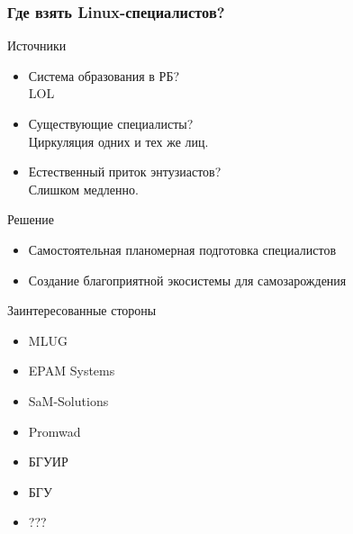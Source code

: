 \begin{frame}
	\frametitle{Где взять Linux-специалистов?}

	\begin{block}{Источники}
		\begin{itemize}
			\item Система образования в РБ? \\
				LOL
				\pause
			\item Существующие специалисты? \\
				Циркуляция одних и тех же лиц.
				\pause
			\item Естественный приток энтузиастов? \\
				Слишком медленно.
		\end{itemize}
	\end{block}
        \pause
	\begin{block}{Решение}
		\begin{itemize}
			\item Самостоятельная планомерная подготовка специалистов
			\item Создание благоприятной экосистемы для самозарождения
		\end{itemize}
	\end{block}
\end{frame}


\begin{frame}[fragile]{Заинтересованные стороны}

	  \begin{itemize}
		\item MLUG
		\item EPAM Systems
		\item SaM-Solutions
		\item Promwad
		\item БГУИР
		\item БГУ
                \item ???
	  \end{itemize}


\end{frame}

